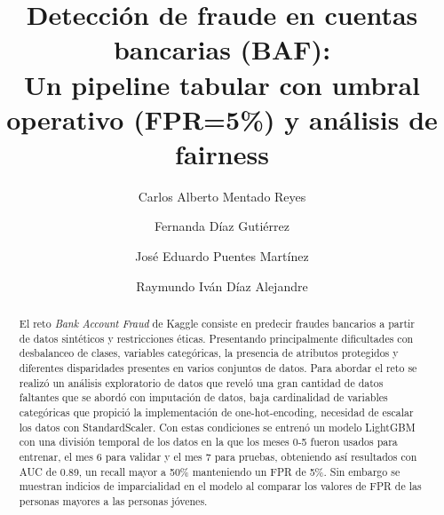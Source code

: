 \documentclass[runningheads]{llncs}
\title{Detección de fraude en cuentas bancarias (BAF):\\
Un pipeline tabular con umbral operativo (FPR=5\%) y análisis de fairness}
\author{Carlos Alberto Mentado Reyes \and
Fernanda Díaz Gutiérrez \and
José Eduardo Puentes Martínez \and
Raymundo Iván Díaz Alejandre}
\institute{Instituto Tecnológico y de Estudios Superiores de Monterrey\\
}
\begin{document}
\maketitle

\begin{abstract}
El reto \textit{Bank Account Fraud} de Kaggle consiste en predecir fraudes bancarios a partir de datos sintéticos y restricciones éticas.
Presentando principalmente dificultades con desbalanceo de clases, variables categóricas, la presencia de atributos protegidos y diferentes disparidades presentes en varios conjuntos de datos.
Para abordar el reto se realizó un análisis exploratorio de datos que reveló una gran cantidad de datos faltantes que se abordó con imputación de datos, baja cardinalidad de variables categóricas que propició la implementación de one-hot-encoding, necesidad de escalar los datos con StandardScaler.
Con estas condiciones se entrenó un modelo LightGBM con una división temporal de los datos en la que los meses 0-5 fueron usados para entrenar, el mes 6 para validar y el mes 7 para pruebas, obteniendo así resultados con AUC de 0.89, un recall mayor a 50\% manteniendo un FPR de 5\%.
Sin embargo se muestran indicios de imparcialidad en el modelo al comparar los valores de FPR de las personas mayores a las personas jóvenes.
\end{abstract}
\end{document}
